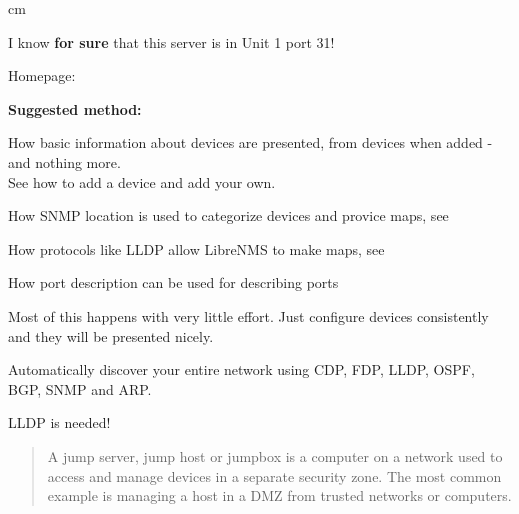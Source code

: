 \documentclass[Screen16to9,17pt]{foils}
\begin{document}
 cm
\centerline{I know {\bf for sure} that this server is in Unit 1 port 31!}




\begin{list2}
\item Homepage: 
\item {\bf Suggested method:}
\item How basic information about devices are presented, from devices when added - and nothing more.\\
See how to add a device and add your own. 
\item How SNMP location is used to categorize devices and provice maps, see\\
\item How protocols like LLDP allow LibreNMS to make maps, see\\
\item How port description can be used for describing ports\\
\end{list2}

Most of this happens with very little effort. Just configure devices consistently and they will be presented nicely.





Automatically discover your entire network using CDP, FDP, LLDP,
OSPF, BGP, SNMP and ARP.



\centerline{LLDP is needed!}





\begin{quote}
A jump server, jump host or jumpbox is a computer on a network used to access and manage devices in a separate security zone. The most common example is managing a host in a DMZ from trusted networks or computers.
\end{quote}
\end{document}
